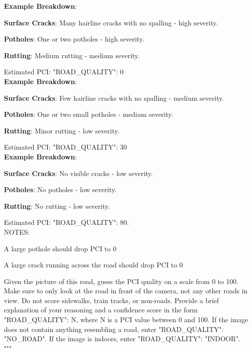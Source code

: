 \documentclass{article}
\begin{document}
\begin{appendices}
\textbf{Example Breakdown}:
\begin{description}[font=$\bullet$~\normalfont]
\item \textbf{Surface Cracks}: Many hairline cracks with no spalling - high severity.
\item \textbf{Potholes}: One or two potholes - high severity.
\item \textbf{Rutting}: Medium rutting - medium severity.
\end{description}
Estimated PCI: {"ROAD\_QUALITY": 0}
~\\

\textbf{Example Breakdown}:
\begin{description}[font=$\bullet$~\normalfont]
\item \textbf{Surface Cracks}: Few hairline cracks with no spalling - medium severity.
\item \textbf{Potholes}: One or two small potholes - medium severity.
\item \textbf{Rutting}: Minor rutting - low severity.
\end{description}
Estimated PCI: {"ROAD\_QUALITY": 30}
~\\

\textbf{Example Breakdown}:
\begin{description}[font=$\bullet$~\normalfont]
\item \textbf{Surface Cracks}: No visible cracks - low severity.
\item \textbf{Potholes}: No potholes - low severity.
\item \textbf{Rutting}: No rutting - low severity.
\end{description}
Estimated PCI: {"ROAD\_QUALITY": 80}.
~\\

NOTES:
\begin{description}[font=$\bullet$~\normalfont]
\item A large pothole should drop PCI to 0
\item A large crack running across the road should drop PCI to 0
\end{description}

Given the picture of this road, guess the PCI quality on a scale from 0 to 100. Make sure to only look at the road in front of the camera, not any other roads in view. Do not score sidewalks, train tracks, or non-roads. Provide a brief explanation of your reasoning and a confidence score in the form {"ROAD\_QUALITY": N}, where N is a PCI value between 0 and 100. If the image does not contain anything resembling a road, enter {"ROAD\_QUALITY": "NO\_ROAD"}. If the image is indoors, enter {"ROAD\_QUALITY": "INDOOR"}.
\\"""


\end{appendices}
\end{document}
